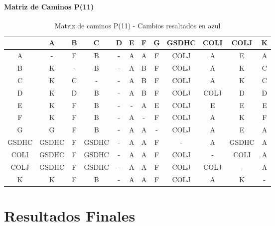 \documentclass[12pt]{article}
\begin{document}
\paragraph{Matriz de Caminos P(11)}
\begin{table}[h!]
\centering
\begin{tabular}{|c|c|c|c|c|c|c|c|c|c|c|c|}
\hline
 & A & B & C & D & E & F & G & GSDHC & COLI & COLJ & K \\\hline
A & - & F & B & - & A & A & F & COLJ & A & E & A \\\hline
B & \cellcolor{lightblue} K & - & B & - & A & B & F & COLJ & A & \cellcolor{lightblue} K & C \\\hline
C & \cellcolor{lightblue} K & C & - & - & \cellcolor{lightblue} A & B & F & COLJ & \cellcolor{lightblue} A & \cellcolor{lightblue} K & C \\\hline
D & \cellcolor{lightblue} K & D & B & - & \cellcolor{lightblue} A & B & F & COLJ & COLJ & D & D \\\hline
E & \cellcolor{lightblue} K & F & B & - & - & A & E & COLJ & E & E & E \\\hline
F & \cellcolor{lightblue} K & F & B & - & A & - & F & COLJ & A & \cellcolor{lightblue} K & F \\\hline
G & G & F & B & - & A & A & - & COLJ & A & E & A \\\hline
GSDHC & GSDHC & F & GSDHC & - & A & A & F & - & A & GSDHC & A \\\hline
COLI & GSDHC & F & GSDHC & - & A & A & F & COLJ & - & COLI & A \\\hline
COLJ & GSDHC & F & GSDHC & - & A & A & F & COLJ & COLJ & - & A \\\hline
K & K & F & B & - & A & A & F & COLJ & A & K & - \\\hline
\end{tabular}
\caption{Matriz de caminos P(11) - Cambios resaltados en azul}
\end{table}

\clearpage
\section{Resultados Finales}
\end{document}
